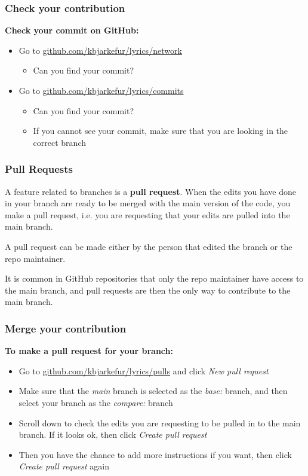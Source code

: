 \documentclass[aspectratio=169]{beamer} %
\newcommand{\trainingURL}[1]{{\color{blue}\url{#1}}}
\newcommand{\traininerUsername}{kbjarkefur}
\newcommand{\repoName}{\traininerUsername/lyrics}
\newcommand{\trainingRepoURL}[1]{\trainingURL{github.com/\repoName #1}}
\begin{document}
\begin{frame}
\begin{columns}[c]
\end{columns}

\end{frame}

\begin{frame}
\frametitle{Check your contribution}

	\textbf{Check your commit on GitHub:}
	\begin{itemize}
		\item Go to \trainingRepoURL{/network}
		\begin{itemize}
			\item Can you find your commit?
		\end{itemize}
		\item Go to \trainingRepoURL{/commits}
		\begin{itemize}
			\item Can you find your commit?
			\item If you cannot see your commit, make sure that you are looking in the correct branch
		\end{itemize}
	\end{itemize}

\end{frame}

\begin{frame}
\frametitle{Pull Requests}

	A feature related to branches is a \textbf{pull request}.
	When the edits you have done in your branch
	are ready to be merged with the main version of the code,
	you make a pull request, i.e. you are requesting that
	your edits are pulled into the main branch.


	A pull request can be made either by the person that edited the branch or the repo maintainer.

	It is common in GitHub repositories that only the repo maintainer have access to the main branch, and pull requests are then the only way to contribute to the main branch.


\end{frame}

\begin{frame}
\frametitle{Merge your contribution}

	\textbf{To make a pull request for your branch:}
	\begin{itemize}
		\item Go to \trainingRepoURL{/pulls} and click \textit{New pull request}
		\item Make sure that the \textit{main} branch is selected as the \textit{base:} branch, and then select your branch as the \textit{compare:} branch
		\item Scroll down to check the edits you are requesting to be pulled in to the main branch. If it looks ok, then click \textit{Create pull request}
		\item Then you have the chance to add more instructions if you want, then click \textit{Create pull request} again
	\end{itemize}
\end{frame}
\end{document}

